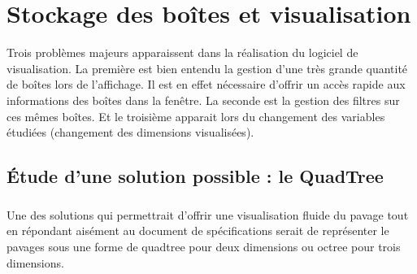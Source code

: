 \chapter{Stockage des boîtes et visualisation}
Trois problèmes majeurs apparaissent dans la réalisation du logiciel de visualisation. La première est bien entendu la gestion d'une très grande quantité de boîtes lors de l'affichage. Il est en effet nécessaire d'offrir un accès rapide aux informations des boîtes dans la fenêtre. La seconde est la gestion des filtres sur ces mêmes boîtes. Et le troisième apparait lors du changement des variables étudiées (changement des dimensions visualisées).

\section{\'Etude d'une solution possible : le QuadTree}
\paragraph{}Une des solutions qui permettrait d'offrir une visualisation fluide du pavage tout en répondant aisément au document de spécifications serait de représenter le pavages sous une forme de quadtree pour deux dimensions ou octree pour trois dimensions.


